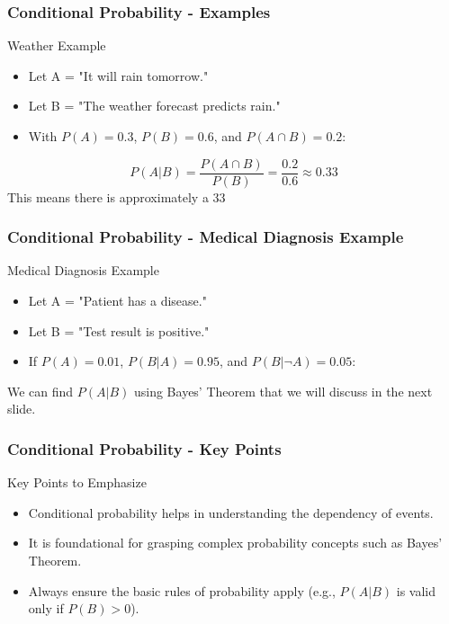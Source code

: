 \documentclass[aspectratio=169]{beamer}
\begin{document}
\begin{frame}[fragile]
    \frametitle{Conditional Probability - Examples}
    \begin{block}{Weather Example}
        \begin{itemize}
            \item Let A = "It will rain tomorrow."
            \item Let B = "The weather forecast predicts rain."
            \item With \( P(A) = 0.3 \), \( P(B) = 0.6 \), and \( P(A \cap B) = 0.2 \):
        \end{itemize}
        \begin{equation}
            P(A|B) = \frac{P(A \cap B)}{P(B)} = \frac{0.2}{0.6} \approx 0.33 
        \end{equation}
        This means there is approximately a 33%
    \end{block}
\end{frame}

\begin{frame}[fragile]
    \frametitle{Conditional Probability - Medical Diagnosis Example}
    \begin{block}{Medical Diagnosis Example}
        \begin{itemize}
            \item Let A = "Patient has a disease."
            \item Let B = "Test result is positive."
            \item If \( P(A) = 0.01 \), \( P(B|A) = 0.95 \), and \( P(B|\neg A) = 0.05 \):
        \end{itemize}
        We can find \( P(A|B) \) using Bayes' Theorem that we will discuss in the next slide.
    \end{block}
\end{frame}

\begin{frame}[fragile]
    \frametitle{Conditional Probability - Key Points}
    \begin{block}{Key Points to Emphasize}
        \begin{itemize}
            \item Conditional probability helps in understanding the dependency of events.
            \item It is foundational for grasping complex probability concepts such as Bayes' Theorem.
            \item Always ensure the basic rules of probability apply (e.g., \( P(A|B) \) is valid only if \( P(B) > 0 \)).
        \end{itemize}
    \end{block}
\end{frame}
\end{document}
